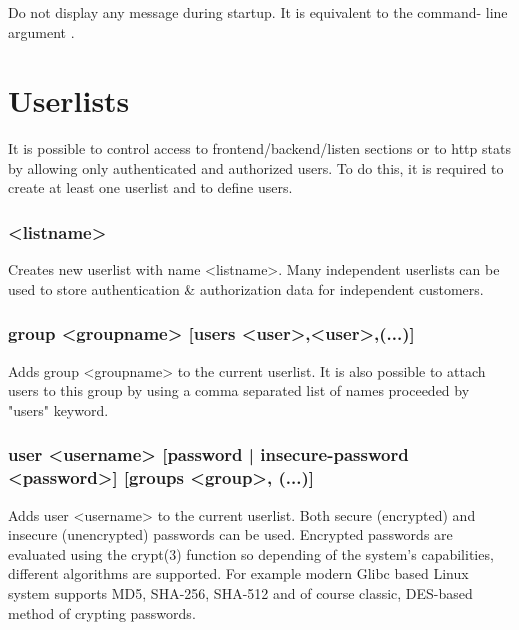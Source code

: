 \subsubsection[quiet]{}

Do not display any message during startup. It is equivalent to the command-
line argument .

\section{Userlists}
\label{sec:userlists}

It is possible to control access to frontend/backend/listen sections or to
http stats by allowing only authenticated and authorized users. To do this,
it is required to create at least one userlist and to define users.

\subsubsection[userlist]{ <listname>}

Creates new userlist with name <listname>. Many independent userlists can be
used to store authentication \& authorization data for independent customers.

\subsubsection[group]{group <groupname> [users <user>,<user>,(...)]}

Adds group <groupname> to the current userlist. It is also possible to
attach users to this group by using a comma separated list of names
proceeded by "users" keyword.

\subsubsection[user]{user <username> [password | insecure-password <password>]
  [groups <group>, (...)]}

Adds user <username> to the current userlist. Both secure (encrypted) and
insecure (unencrypted) passwords can be used. Encrypted passwords are
evaluated using the crypt(3) function so depending of the system's
capabilities, different algorithms are supported. For example modern Glibc
based Linux system supports MD5, SHA-256, SHA-512 and of course classic,
DES-based method of crypting passwords.

